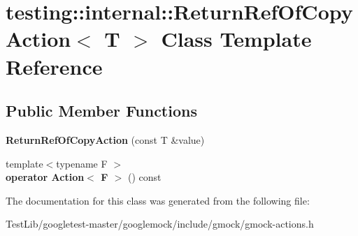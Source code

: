 \hypertarget{classtesting_1_1internal_1_1ReturnRefOfCopyAction}{}\section{testing\+:\+:internal\+:\+:Return\+Ref\+Of\+Copy\+Action$<$ T $>$ Class Template Reference}
\label{classtesting_1_1internal_1_1ReturnRefOfCopyAction}
\subsection*{Public Member Functions}
\begin{DoxyCompactItemize}
\item 
\mbox{\label{classtesting_1_1internal_1_1ReturnRefOfCopyAction_a073c18a8b50423b08f6603e860622839}} 
{\bfseries Return\+Ref\+Of\+Copy\+Action} (const T \&value)
\item 
\mbox{\label{classtesting_1_1internal_1_1ReturnRefOfCopyAction_a8b4829fbb46c3ca6468f3eb5c5b42493}} 
{\footnotesize template$<$typename F $>$ }\\{\bfseries operator Action$<$ F $>$} () const
\end{DoxyCompactItemize}


The documentation for this class was generated from the following file\+:\begin{DoxyCompactItemize}
\item 
Test\+Lib/googletest-\/master/googlemock/include/gmock/gmock-\/actions.\+h\end{DoxyCompactItemize}
